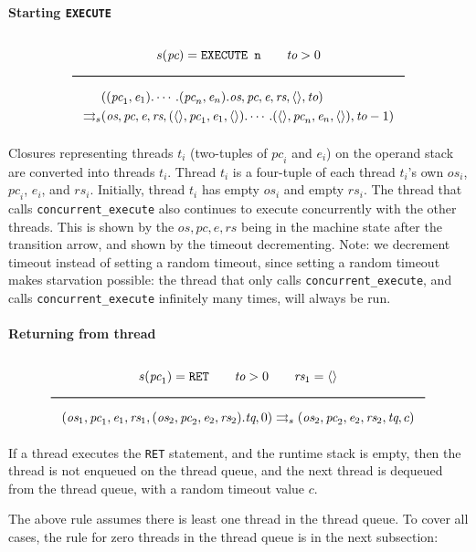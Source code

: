 \paragraph{Starting \texttt{EXECUTE}}
\label{sec:org4122bdd}
$$\Rule{s(\textit{pc}) = \texttt{EXECUTE n} \qquad \textit{to} > 0}{
\begin{aligned}
&((\textit{pc}_1, \textit{e}_1). \cdots .(\textit{pc}_n, \textit{e}_n).\textit{os}, \textit{pc}, \textit{e}, \textit{rs}, \langle \rangle, \textit{to})\\
\transition &(\textit{os}, \textit{pc}, \textit{e}, \textit{rs}, (\langle \rangle, \textit{pc}_1, \textit{e}_1, \langle \rangle). \cdots .(\langle \rangle, \textit{pc}_n, \textit{e}_n, \langle \rangle), \textit{to}-1)
\end{aligned}}$$
Closures representing threads \(t_i\) (two-tuples of \(\textit{pc}_i\) and \(\textit{e}_i\)) on the operand stack are converted into threads \(t_i\). Thread \(t_i\) is a four-tuple of each thread \(t_i\)'s own \(\textit{os}_i\), \(\textit{pc}_i\), \(\textit{e}_i\), and \(\textit{rs}_i\). Initially, thread \(t_i\) has empty \(\textit{os}_i\) and empty \(\textit{rs}_i\).
The thread that calls \texttt{concurrent\_execute} also continues to execute concurrently with the other threads. This is shown by the \(\textit{os}, \textit{pc}, \textit{e}, \textit{rs}\) being in the machine state after the transition arrow, and shown by the timeout decrementing.
Note: we decrement timeout instead of setting a random timeout, since setting a random timeout makes starvation possible: the thread that only calls \texttt{concurrent\_execute}, and calls \texttt{concurrent\_execute} infinitely many times, will always be run.

\paragraph{Returning from thread}
\label{sec:org8d9b4a3}
$$\Rule{s(\textit{pc}_1) = \texttt{RET} \qquad \textit{to} > 0 \qquad \textit{rs}_1 = \langle \rangle}{(\textit{os}_1, \textit{pc}_1, \textit{e}_1, \textit{rs}_1, (\textit{os}_2, \textit{pc}_2, \textit{e}_2, \textit{rs}_2).\textit{tq}, 0) \transition (\textit{os}_2, \textit{pc}_2, \textit{e}_2, \textit{rs}_2, \textit{tq}, c)}$$
If a thread executes the \texttt{RET} statement, and the runtime stack is empty, then the thread is not enqueued on the thread queue, and the next thread is dequeued from the thread queue, with a random timeout value \(c\).

The above rule assumes there is least one thread in the thread queue. To cover all cases, the rule for zero threads in the thread queue is in the next subsection:

